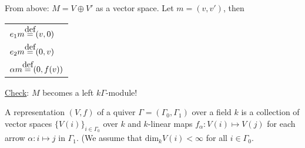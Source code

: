 From above: \(M = V\oplus V'\) as a vector space. Let \(m = (v, v')\), then\\
\begin{center}
\begin{tabular}{l}
\(e_1m \defeq (v, 0)\)\\
\(e_2m \defeq (0, v)\)\\
\(\alpha m \defeq (0, f(v))\)
\end{tabular}
\end{center}
\underline{Check}: \(M\) becomes a left \(k\Gamma\)-module!
\begin{defin}
A representation \((V, f)\) of a quiver \(\Gamma = (\Gamma_0, \Gamma_1)\) over a field \(k\) is a collection of vector spaces \(\{V(i)\}_{i\in\Gamma_0}\) over \(k\) and \(k\)-linear maps \(f_\alpha:V(i)\mapsto V(j)\) for each arrow \(\alpha: i\mapsto j\) in \(\Gamma_1\). (We assume that \(\text{dim}_kV(i) < \infty\) for all \(i\in\Gamma_0\).
\end{defin}
